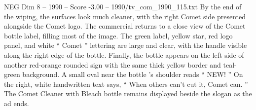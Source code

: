 \begin{textsample}{NEG Dim 8 – 1990 – Score -3.00 – 1990/tv\_com\_1990\_115.txt}
By the end of the wiping, the surfaces look much cleaner, with the right Comet side presented alongside the Comet logo.
The commercial returns to a close view of the Comet bottle label, filling most of the image.
The green label, yellow star, red logo panel, and white “ Comet ” lettering are large and clear, with the handle visible along the right edge of the bottle.
Finally, the bottle appears on the left side of another red-orange rounded sign with the same thick yellow border and teal-green background.
A small oval near the bottle ’s shoulder reads “ NEW! ” On the right, white handwritten text says, “ When others can't cut it, Comet can. ” The Comet Cleaner with Bleach bottle remains displayed beside the slogan as the ad ends.

\end{textsample}
